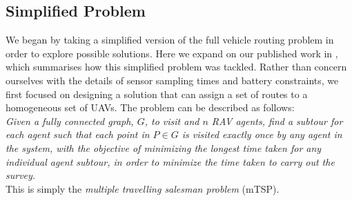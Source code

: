 \subsection{Simplified Problem}
We began by taking a simplified version of the full vehicle routing problem in order to explore possible solutions. Here we expand on our published work in \cite{Smyth2018UsingDrones}, which summarises how this simplified problem was tackled. Rather than concern ourselves with the details of sensor sampling times and battery constraints, we first focused on designing a solution that can assign a set of routes to a homogeneous set of UAVs. 
The problem can be described as follows:
\\
\textit{Given a fully connected graph, $G$, to visit and $n$ RAV agents, find a subtour for each agent such that each point in $P \in G$ is visited exactly once by any agent in the system, with the objective of minimizing the longest time taken for any individual agent subtour, in order to minimize the time taken to carry out the survey.}
\\
This is simply the \textit{multiple travelling salesman problem} (mTSP). 


